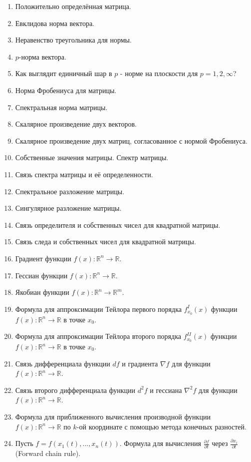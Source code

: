 \documentclass[11pt]{article}
\newcommand{\R}{\mathbb{R}}
\begin{document}
\begin{enumerate}
    \setlength\itemsep{-0.3em}
    \item Положительно определённая матрица.
    \item Евклидова норма вектора.
    \item Неравенство треугольника для нормы.
    \item $p$-норма вектора.
    \item Как выглядит единичный шар в $p$ - норме на плоскости для $p=1,2,\infty$?
    \item Норма Фробениуса для матрицы.
    \item Спектральная норма матрицы.
    \item Скалярное произведение двух векторов.
    \item Скалярное произведение двух матриц, согласованное с нормой Фробениуса.
    \item Собственные значения матрицы. Спектр матрицы.
    \item Связь спектра матрицы и её определенности.
    \item Спектральное разложение матрицы.
    \item Сингулярное разложение матрицы.
    \item Связь определителя и собственных чисел для квадратной матрицы.
    \item Связь следа и собственных чисел для квадратной матрицы.
    \item Градиент функции $f(x): \R^n \to \R$.
    \item Гессиан функции $f(x): \R^n \to \R$.
    \item Якобиан функции $f(x): \R^n \to \R^m$.
    \item Формула для аппроксимации Тейлора первого порядка $f^I_{x_0}(x)$ функции $f(x): \R^n \to \R$ в точке $x_0$.
    \item Формула для аппроксимации Тейлора второго порядка $f^{II}_{x_0}(x)$ функции $f(x): \R^n \to \R$ в точке $x_0$.
    \item Связь дифференциала функции $df$ и градиента $\nabla f$ для функции $f(x): \R^n \to \R$.
    \item Связь второго дифференциала функции $d^2f$ и гессиана $\nabla^2 f$ для функции $f(x): \R^n \to \R$.
    \item Формула для приближенного вычисления производной функции $f(x): \R^n \to \R$ по $k$-ой координате с помощью метода конечных разностей.
    \item Пусть $f = f(x_1(t), \ldots, x_n(t))$. Формула для вычисления $\frac{\partial f}{\partial t}$ через $\frac{\partial x_i}{\partial t}$ (Forward chain rule).

\end{enumerate}
\end{document}
